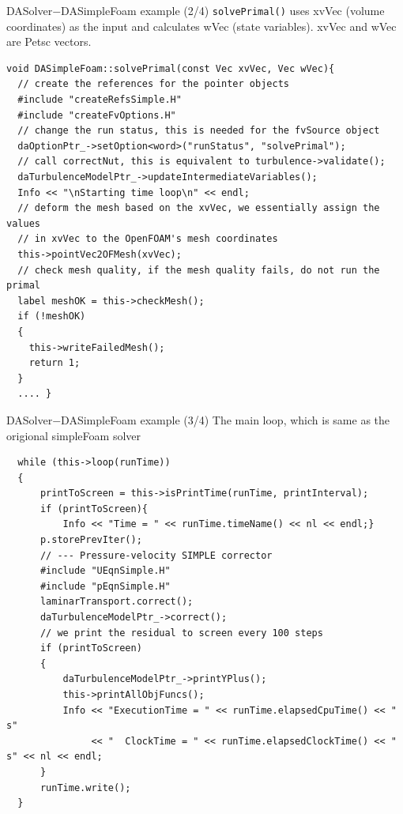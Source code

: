 \documentclass{bredelebeamer}
\begin{document}
\begin{frame}[fragile]{DASolver$-$DASimpleFoam example (2/4)}
  \texttt{solvePrimal()} uses xvVec (volume coordinates) as the input and calculates wVec (state variables). xvVec and wVec are Petsc vectors.
\footnotesize
\lstset{ language=c++ }
\begin{lstlisting}
void DASimpleFoam::solvePrimal(const Vec xvVec, Vec wVec){
  // create the references for the pointer objects
  #include "createRefsSimple.H"
  #include "createFvOptions.H"
  // change the run status, this is needed for the fvSource object
  daOptionPtr_->setOption<word>("runStatus", "solvePrimal");
  // call correctNut, this is equivalent to turbulence->validate();
  daTurbulenceModelPtr_->updateIntermediateVariables();
  Info << "\nStarting time loop\n" << endl;
  // deform the mesh based on the xvVec, we essentially assign the values 
  // in xvVec to the OpenFOAM's mesh coordinates
  this->pointVec2OFMesh(xvVec);
  // check mesh quality, if the mesh quality fails, do not run the primal
  label meshOK = this->checkMesh();
  if (!meshOK)
  {
    this->writeFailedMesh();
    return 1;
  }
  .... }
\end{lstlisting}
\normalsize

\end{frame}

\begin{frame}[fragile]{DASolver$-$DASimpleFoam example (3/4)}
The main loop, which is same as the origional simpleFoam solver
\footnotesize
\lstset{ language=c++ }
\begin{lstlisting}
  while (this->loop(runTime))
  {
      printToScreen = this->isPrintTime(runTime, printInterval);
      if (printToScreen){
          Info << "Time = " << runTime.timeName() << nl << endl;}
      p.storePrevIter();
      // --- Pressure-velocity SIMPLE corrector
      #include "UEqnSimple.H"
      #include "pEqnSimple.H"
      laminarTransport.correct();
      daTurbulenceModelPtr_->correct();
      // we print the residual to screen every 100 steps
      if (printToScreen)
      {
          daTurbulenceModelPtr_->printYPlus();
          this->printAllObjFuncs();
          Info << "ExecutionTime = " << runTime.elapsedCpuTime() << " s"
               << "  ClockTime = " << runTime.elapsedClockTime() << " s" << nl << endl;
      }
      runTime.write();
  }
\end{lstlisting}
\normalsize

\end{frame}
\end{document}
